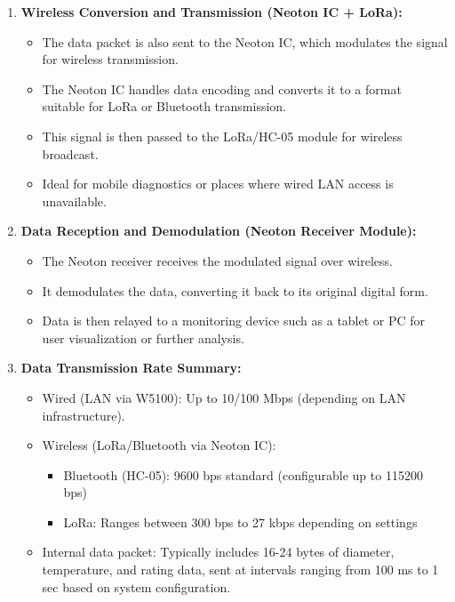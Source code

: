 \documentclass[12pt]{report}
\begin{document}
\begin{enumerate}
    \item \textbf{Wireless Conversion and Transmission (Neoton IC + LoRa):}
    \begin{itemize}
        \item The data packet is also sent to the Neoton IC, which modulates the signal for wireless transmission.
        \item The Neoton IC handles data encoding and converts it to a format suitable for LoRa or Bluetooth transmission.
        \item This signal is then passed to the LoRa/HC-05 module for wireless broadcast.
        \item Ideal for mobile diagnostics or places where wired LAN access is unavailable.
    \end{itemize}
    
    \item \textbf{Data Reception and Demodulation (Neoton Receiver Module):}
    \begin{itemize}
        \item The Neoton receiver receives the modulated signal over wireless.
        \item It demodulates the data, converting it back to its original digital form.
        \item Data is then relayed to a monitoring device such as a tablet or PC for user visualization or further analysis.
    \end{itemize}
    
    \item \textbf{Data Transmission Rate Summary:}
    \begin{itemize}
        \item Wired (LAN via W5100): Up to 10/100 Mbps (depending on LAN infrastructure).
        \item Wireless (LoRa/Bluetooth via Neoton IC):
        \begin{itemize}
            \item Bluetooth (HC-05): 9600 bps standard (configurable up to 115200 bps)
            \item LoRa: Ranges between 300 bps to 27 kbps depending on settings
        \end{itemize}
        \item Internal data packet: Typically includes 16-24 bytes of diameter, temperature, and rating data, sent at intervals ranging from 100 ms to 1 sec based on system configuration.
    \end{itemize}
\end{enumerate}
\end{document}
